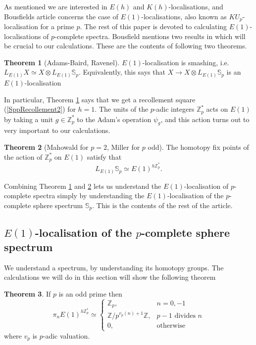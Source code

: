 \documentclass[a4paper]{article} %
\theoremstyle{definition}
\newtheorem{theorem}{Theorem} %
\newcommand{\Z}{\mathbb{Z}}
\begin{document}
As mentioned we are interested in $E(h)$ and $K(h)$-localisations, and Bousfields article \cite{bousfield1979localization} concerns the case of $E(1)$-localisations, also known as $KU_p$-localisation for a prime $p$. The rest of this paper is devoted to calculating $E(1)$-localisations of $p$-complete spectra. Bousfield mentions two results in \cite{bousfield1979localization} which will be crucial to our calculations. These are the contents of following two theorems.
\begin{theorem}[Adams-Baird, Ravenel]\label{Adams-Baird, Ravenel}
  $E(1)$-localisation is smashing, i.e. $L_{E(1)}X \simeq X \otimes L_{E(1)} \mathbb{S}_p$. Equivalently, this says that $X \to X \otimes L_{E(1)} \mathbb{S}_p$ is an $E(1)$-localisation
\end{theorem}
In particular, Theorem \ref{Adams-Baird, Ravenel} says that we get a recollement square (\ref{SppRecollement2}) for $h=1$. The units of the $p$-adic integers $\Z_p^*$ acts on $E(1)$ by taking a unit $g \in \Z_p^*$ to the Adam's operation $\psi_g$, and this action turns out to very important to our calculations.
\begin{theorem}[Mahowald for $p=2$, Miller for $p$ odd]\label{Mahowald, Miller}
   The homotopy fix points of the action of $\Z_p^*$ on $E(1)$ satisfy that
     $$L_{E(1)}\mathbb{S}_p \simeq E(1)^{h\Z_p^*}.$$
\end{theorem}
Combining Theorem \ref{Adams-Baird, Ravenel} and \ref{Mahowald, Miller} lets us understand the $E(1)$-localisation of $p$-complete spectra simply by understanding the $E(1)$-localisation of the $p$-complete sphere spectrum $\mathbb{S}_p$. This is the contents of the rest of the article.

\subsection{$E(1)$-localisation of the $p$-complete sphere spectrum}

We understand a spectrum, by understanding its homotopy groups. The calculations we will do in this section will show the following theorem
\begin{theorem}
 If $p$ is an odd prime  then
 \[
  \pi_n E(1)^{h\Z_p^*} \simeq
    \begin{cases}
    \Z_p, & n=0,-1 \\
    \Z/p^{v_p(n)+1}\Z, & p-1 \text{ divides } n \\
    0, & \text{otherwise}
    \end{cases}
  \]
  where $v_p$ is $p$-adic valuation.
\end{theorem}
\end{document}
